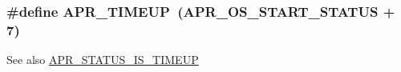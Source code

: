 \subsubsection[{\texorpdfstring{A\+P\+R\+\_\+\+T\+I\+M\+E\+UP}{APR_TIMEUP}}]{\setlength{\rightskip}{0pt plus 5cm}\#define A\+P\+R\+\_\+\+T\+I\+M\+E\+UP~({\bf A\+P\+R\+\_\+\+O\+S\+\_\+\+S\+T\+A\+R\+T\+\_\+\+S\+T\+A\+T\+US} + 7)}\hypertarget{group__APR__Error_ga9ac087c25ffb0d3bb4d75bee36709853}{}\label{group__APR__Error_ga9ac087c25ffb0d3bb4d75bee36709853}
\begin{DoxySeeAlso}{See also}
\hyperlink{group__APR__STATUS__IS_ga864b207719c86ac4deeba696943262d0}{A\+P\+R\+\_\+\+S\+T\+A\+T\+U\+S\+\_\+\+I\+S\+\_\+\+T\+I\+M\+E\+UP} 
\end{DoxySeeAlso}
